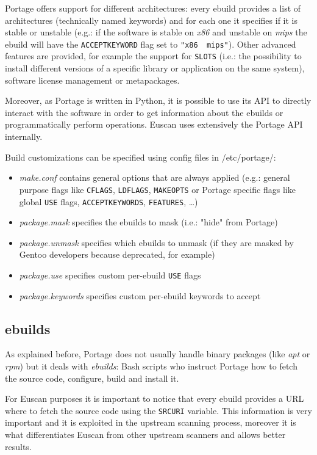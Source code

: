 Portage offers support for different architectures: every ebuild provides a list of architectures (technically named keywords) and for each one it specifies if it is stable or unstable (e.g.: if the software is stable on \emph{x86} and unstable on \emph{mips} the ebuild will have the \texttt{ACCEPT\textunderscore KEYWORD} flag set to \texttt{"x86 ~mips"}). 
Other advanced features are provided, for example the support for \texttt{SLOTS} (i.e.: the possibility to install different versions of a specific library or application on the same system), software license management or metapackages.

Moreover, as Portage is written in Python, it is possible to use its API to directly interact with the software in order to get information about the ebuilds or programmatically perform operations. Euscan uses extensively the Portage API internally.

\vspace{0.5cm}

Build customizations can be specified using config files in /etc/portage/:
\begin{itemize}
\item \emph{make.conf} contains general options that are always applied (e.g.: general  purpose flags like \texttt{CFLAGS}, \texttt{LDFLAGS}, \texttt{MAKEOPTS} or Portage specific flags like global \texttt{USE} flags, \texttt{ACCEPT\textunderscore KEYWORDS}, \texttt{FEATURES}, \ldots)
\item \emph{package.mask} specifies the ebuilds to mask (i.e.: "hide" from Portage)
\item \emph{package.unmask} specifies which ebuilds to unmask (if they are masked by Gentoo developers because deprecated, for example)
\item \emph{package.use} specifies custom per-ebuild \texttt{USE} flags
\item \emph{package.keywords} specifies custom per-ebuild keywords to accept
\end{itemize}


\subsection{ebuilds}
As explained before, Portage does not usually handle binary packages (like \emph{apt} or \emph{rpm}) but it deals with \emph{ebuilds}: Bash scripts who instruct Portage how to fetch the source code, configure, build and install it.

For Euscan purposes it is important to notice that every ebuild provides a URL where to fetch the source code using the \texttt{SRC\textunderscore URI} variable. This information is very important and it is exploited in the upstream scanning process, moreover it is what differentiates Euscan from other upstream scanners and allows better results.

